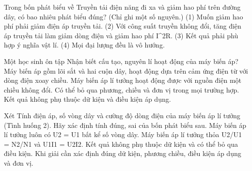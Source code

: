 \begin{ex}
Trong bốn phát biểu về Truyền tải điện năng đi xa và giảm hao phí trên đường dây, có bao nhiêu phát biểu đúng? (Chỉ ghi một số nguyên.) (1) Muốn giảm hao phí phải giảm điện áp truyền tải. (2) Với công suất truyền không đổi, tăng điện áp truyền tải làm giảm dòng điện và giảm hao phí I^2R. (3) Kết quả phải phù hợp ý nghĩa vật lí. (4) Mọi đại lượng đều là vô hướng.
\end{ex}

\begin{ex}
Một học sinh ôn tập Nhận biết cấu tạo, nguyên lí hoạt động của máy biến áp?
\choice
{\True Máy biến áp gồm lõi sắt và hai cuộn dây, hoạt động dựa trên cảm ứng điện từ với dòng điện xoay chiều.}
{Máy biến áp lí tưởng hoạt động được với nguồn điện một chiều không đổi.}
{Có thể bỏ qua phương, chiều và đơn vị trong mọi trường hợp.}
{Kết quả không phụ thuộc dữ kiện và điều kiện áp dụng.}
\end{ex}

\begin{ex}
Xét Tính điện áp, số vòng dây và cường độ dòng điện của máy biến áp lí tưởng (Tình huống 2). Hãy xác định tính đúng, sai của bốn phát biểu sau.
\choiceTF
{Máy biến áp lí tưởng luôn có U2 = U1 bất kể số vòng dây.}
{\True Máy biến áp lí tưởng thỏa U2/U1 = N2/N1 và U1I1 = U2I2.}
{Kết quả không phụ thuộc dữ kiện và có thể bỏ qua điều kiện.}
{\True Khi giải cần xác định đúng dữ kiện, phương chiều, điều kiện áp dụng và đơn vị.}
\end{ex}

